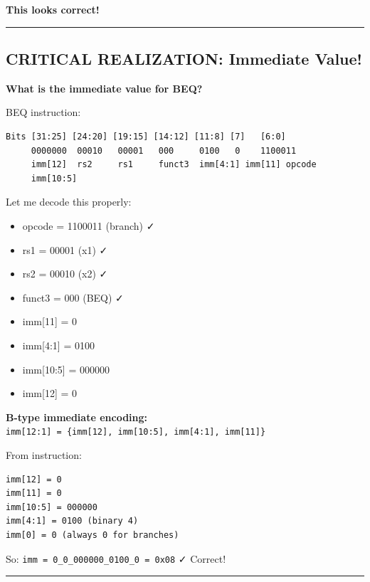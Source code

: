 \begin{record}
\textbf{This looks correct!}

\begin{center}\rule{0.5\linewidth}{0.5pt}\end{center}

\end{record}

\subsection{\texorpdfstring{CRITICAL REALIZATION: Immediate Value!
\warn{}}{CRITICAL REALIZATION: Immediate Value! }}\label{cr:fix:timing-analysis:critical-realization-immediate-value-fire}

\begin{record}

\textbf{What is the immediate value for BEQ?}

BEQ instruction: 

\begin{lstlisting}[language={}]
Bits [31:25] [24:20] [19:15] [14:12] [11:8] [7]   [6:0]
     0000000  00010   00001   000     0100   0    1100011
     imm[12]  rs2     rs1     funct3  imm[4:1] imm[11] opcode
     imm[10:5]
\end{lstlisting}

Let me decode this properly:

\begin{itemize}
\tightlist
\item
  opcode = 1100011 (branch) ✓
\item
  rs1 = 00001 (x1) ✓
\item
  rs2 = 00010 (x2) ✓
\item
  funct3 = 000 (BEQ) ✓
\item
  imm{[}11{]} = 0
\item
  imm{[}4:1{]} = 0100
\item
  imm{[}10:5{]} = 000000
\item
  imm{[}12{]} = 0
\end{itemize}

\textbf{B-type immediate encoding:}
\texttt{imm[12:\allowbreak{}1]\ =\allowbreak{}\ \{imm[12],\allowbreak{}\ imm[10:\allowbreak{}5],\allowbreak{}\ imm[4:\allowbreak{}1],\allowbreak{}\ imm[11]\}}

From instruction:

\begin{lstlisting}[language={}]
imm[12] = 0
imm[11] = 0
imm[10:5] = 000000
imm[4:1] = 0100 (binary 4)
imm[0] = 0 (always 0 for branches)
\end{lstlisting}

So:
\texttt{imm\ =\allowbreak{}\ 0\_\allowbreak{}0\_\allowbreak{}000000\_\allowbreak{}0100\_\allowbreak{}0\ =\allowbreak{}\ 0x08}
✓ Correct!

\begin{center}\rule{0.5\linewidth}{0.5pt}\end{center}

\end{record}

